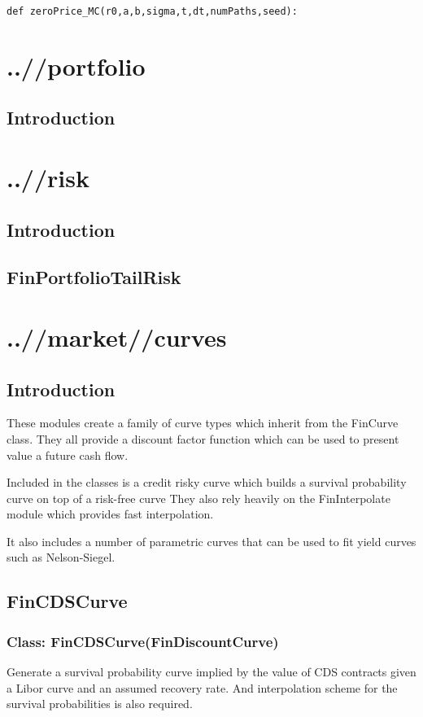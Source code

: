\documentclass[twoside,11pt]{book}
\begin{document}
\begin{lstlisting}
def zeroPrice_MC(r0,a,b,sigma,t,dt,numPaths,seed):
\end{lstlisting}


\chapter{..//portfolio}
\section{Introduction}


\chapter{..//risk}
\section{Introduction}

\newpage
\section{FinPortfolioTailRisk}


\chapter{..//market//curves}
\section{Introduction}
These modules create a family of curve types which inherit from the FinCurve class. They all provide a discount factor function which can be used to present value a future cash flow. 

Included in the classes is a credit risky curve which builds a survival probability curve on top of a risk-free curve They also rely heavily on the FinInterpolate module which provides fast interpolation.

It also includes a number of parametric curves that can be used to fit yield curves such as Nelson-Siegel.
\newpage
\section{FinCDSCurve}

\subsection{Class: FinCDSCurve(FinDiscountCurve)}
Generate a survival probability curve implied by the value of CDS contracts given a Libor curve and an assumed recovery rate. And interpolation scheme for the survival probabilities is also required. 
\end{document}
